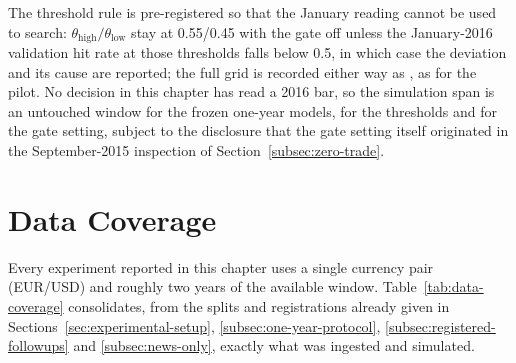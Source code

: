 The threshold rule is pre-registered so that the January reading cannot be used to search: $\theta_{\text{high}}/\theta_{\text{low}}$ stay at 0.55/0.45 with the gate off unless the January-2016 validation hit rate at those thresholds falls below 0.5, in which case the deviation and its cause are reported; the full grid is recorded either way as , as for the pilot. No decision in this chapter has read a 2016 bar, so the simulation span is an untouched window for the frozen one-year models, for the thresholds and for the gate setting, subject to the disclosure that the gate setting itself originated in the September-2015 inspection of Section~\ref{subsec:zero-trade}.

\section{Data Coverage} \label{sec:coverage-results}

Every experiment reported in this chapter uses a single currency pair (EUR/USD) and roughly two years of the available window. Table~\ref{tab:data-coverage} consolidates, from the splits and registrations already given in Sections~\ref{sec:experimental-setup}, \ref{subsec:one-year-protocol}, \ref{subsec:registered-followups} and \ref{subsec:news-only}, exactly what was ingested and simulated.

